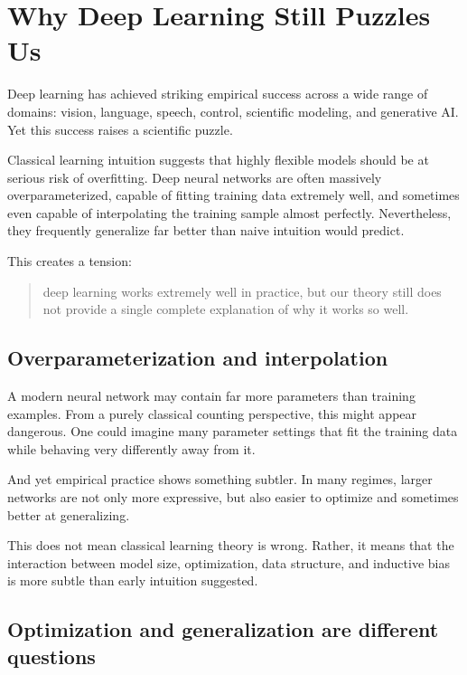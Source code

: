 
\section{Why Deep Learning Still Puzzles Us}

Deep learning has achieved striking empirical success across a wide range of domains:
vision, language, speech, control, scientific modeling, and generative AI.
Yet this success raises a scientific puzzle.

\medskip

Classical learning intuition suggests that highly flexible models should be at serious risk of overfitting.
Deep neural networks are often massively overparameterized, capable of fitting training data extremely well, and sometimes even capable of interpolating the training sample almost perfectly.
Nevertheless, they frequently generalize far better than naive intuition would predict.

\medskip

This creates a tension:

\begin{quote}
deep learning works extremely well in practice, but our theory still does not provide a single complete explanation of why it works so well.
\end{quote}

\subsection*{Overparameterization and interpolation}

A modern neural network may contain far more parameters than training examples.
From a purely classical counting perspective, this might appear dangerous.
One could imagine many parameter settings that fit the training data while behaving very differently away from it.

\medskip

And yet empirical practice shows something subtler.
In many regimes, larger networks are not only more expressive, but also easier to optimize and sometimes better at generalizing.

\medskip

This does not mean classical learning theory is wrong.
Rather, it means that the interaction between model size, optimization, data structure, and inductive bias is more subtle than early intuition suggested.

\subsection*{Optimization and generalization are different questions}

